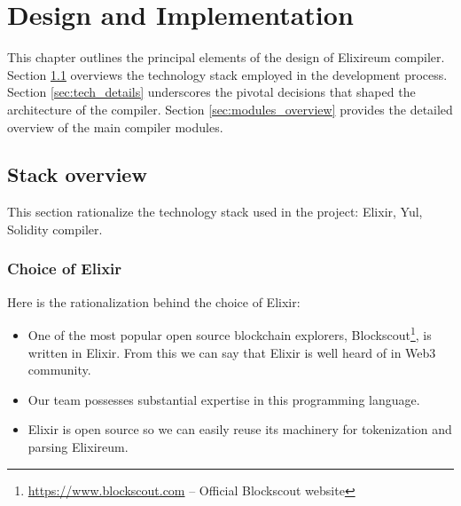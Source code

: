 \chapter{Design and Implementation}
\label{chap:impl}








This chapter outlines the principal elements of the design of Elixireum compiler. Section \ref{sec:architecture} overviews the technology stack employed in the development process. Section \ref{sec:tech_details} underscores the pivotal decisions that shaped the architecture of the compiler. Section \ref{sec:modules_overview} provides the detailed overview of the main compiler modules.


\section{Stack overview}
\label{sec:architecture}
This section rationalize the technology stack used in the project: Elixir, Yul, Solidity compiler.
\subsection{Choice of Elixir}
Here is the rationalization behind the choice of Elixir:
\begin{itemize}
    \item One of the most popular open source blockchain explorers, Blockscout\footnote{\href{https://www.blockscout.com/}{https://www.blockscout.com} -- Official Blockscout website}, is written in Elixir. From this we can say that Elixir is well heard of in Web3 community.
    \item Our team possesses substantial expertise in this programming language.
    \item Elixir is open source so we can easily reuse its machinery for tokenization and parsing Elixireum.
\end{itemize}

